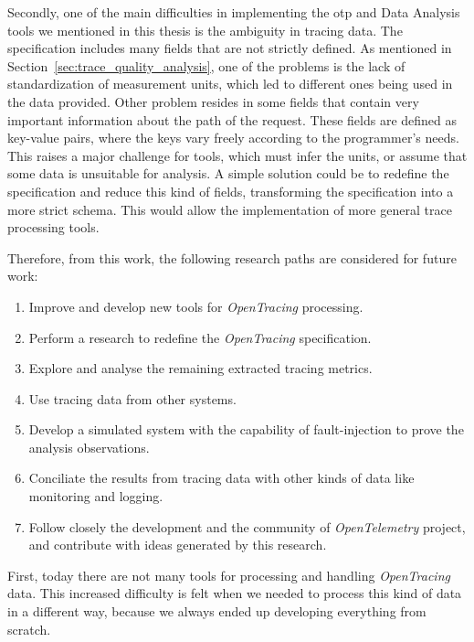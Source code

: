 Secondly, one of the main difficulties in implementing the \gls{otp} and Data Analysis tools we mentioned in this thesis is the ambiguity in tracing data. The specification includes many fields that are not strictly defined. As mentioned in Section~\ref{sec:trace_quality_analysis}, one of the problems is the lack of standardization of measurement units, which led to different ones being used in the data provided. Other problem resides in some fields that contain very important information about the path of the request. These fields are defined as key-value pairs, where the keys vary freely according to the programmer's needs. This raises a major challenge for tools, which must infer the units, or assume that some data is unsuitable for analysis. A simple solution could be to redefine the specification and reduce this kind of fields, transforming the specification into a more strict schema. This would allow the implementation of more general trace processing tools.


Therefore, from this work, the following research paths are considered for future work:

\begin{enumerate}
    \item Improve and develop new tools for \emph{OpenTracing} processing.
    \item Perform a research to redefine the \emph{OpenTracing} specification.
    \item Explore and analyse the remaining extracted tracing metrics.
    \item Use tracing data from other systems.
    \item Develop a simulated system with the capability of fault-injection to prove the analysis observations.
    \item Conciliate the results from tracing data with other kinds of data like monitoring and logging.
    \item Follow closely the development and the community of \emph{OpenTelemetry} project, and contribute with ideas generated by this research.
\end{enumerate}

First, today there are not many tools for processing and handling \emph{OpenTracing} data. This increased difficulty is felt when we needed to process this kind of data in a different way, because we always ended up developing everything from scratch.

